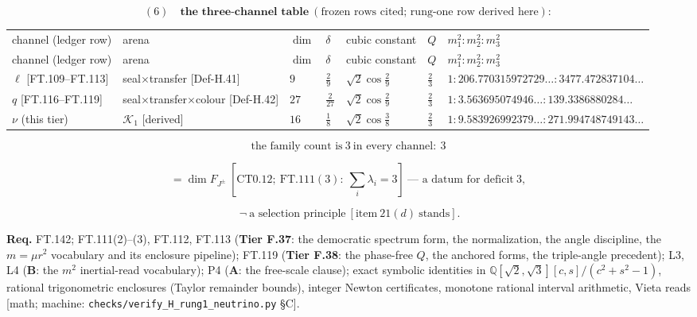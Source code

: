 \[
(6)\quad\textbf{the three-channel table}\ (\text{frozen rows cited; rung-one row derived here}):
\]

{\small\setlength{\tabcolsep}{4pt}
\begin{longtable}{>{\raggedright\arraybackslash}p{}|>{\raggedright\arraybackslash}p{}|>{\raggedright\arraybackslash}p{}|>{\raggedright\arraybackslash}p{}|>{\raggedright\arraybackslash}p{}|>{\raggedright\arraybackslash}p{}|>{\raggedright\arraybackslash}p{}}
\toprule
channel (ledger row) & arena & $\dim$ & $\delta$ & cubic constant & $Q$ & $m_1^2:m_2^2:m_3^2$ \\
\addlinespace[2pt]
\midrule
\endfirsthead
\toprule
channel (ledger row) & arena & $\dim$ & $\delta$ & cubic constant & $Q$ & $m_1^2:m_2^2:m_3^2$ \\
\addlinespace[2pt]
\midrule
\endhead
\bottomrule
\endlastfoot
$\ell$ [FT.109–FT.113] & seal$\times$transfer [Def-H.41] & $9$ & $\tfrac29$ & $\sqrt2\cos\tfrac29$ & $\tfrac23$ & $1:206.770315972729\ldots:3477.472837104\ldots$ \\
$q$ [FT.116–FT.119] & seal$\times$transfer$\times$colour [Def-H.42] & $27$ & $\tfrac2{27}$ & $\sqrt2\cos\tfrac29$ & $\tfrac23$ & $1:3.563695074946\ldots:139.3386880284\ldots$ \\
$\nu$ (this tier) & $\mathcal K_1$ [derived] & $16$ & $\tfrac18$ & $\sqrt2\cos\tfrac38$ & $\tfrac23$ & $1:9.583926992379\ldots:271.994748749143\ldots$ \\
\end{longtable}
}

\[
\text{the family count is}\ 3\ \text{in every channel}:\ 3
\]

\[
= \dim F_{J^\pm}\ [\mathrm{CT0.12};\ \mathrm{FT.111}(3):\ \textstyle\sum_i\lambda_i=3]\ \text{— a datum for deficit}\ 3,
\]

\[
\ \neg\ \text{a selection principle}\ [\text{item}\ 21(d)\ \text{stands}].
\]

\textbf{Req.} FT.142; FT.111(2)–(3), FT.112, FT.113 (\textbf{Tier F.37}: the democratic spectrum form, the normalization, the angle discipline, the $m=\mu r^2$ vocabulary and its enclosure pipeline); FT.119 (\textbf{Tier F.38}: the phase-free $Q$, the anchored forms, the triple-angle precedent); L3, L4 (\textbf{B}: the $m^2$ inertial-read vocabulary); P4 (\textbf{A}: the free-scale clause); exact symbolic identities in $\mathbb Q[\sqrt2,\sqrt3][c,s]/(c^2{+}s^2{-}1)$, rational trigonometric enclosures (Taylor remainder bounds), integer Newton certificates, monotone rational interval arithmetic, Vieta reads [math; machine: \texttt{checks/\allowbreak{}verify\_\allowbreak{}H\_\allowbreak{}rung1\_\allowbreak{}neutrino.py} §C].

